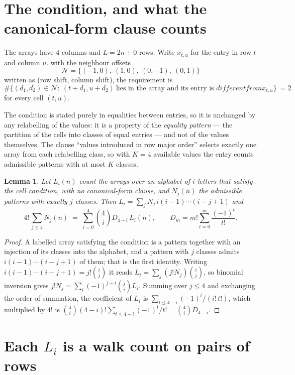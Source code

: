 \documentclass[11pt,a4paper]{article}
\theoremstyle{plain}
\newtheorem{lemma}[theorem]{Lemma}
\theoremstyle{definition}
\begin{document}
\section{The condition, and what the canonical-form clause counts}

The arrays have $4$ columns and $L=2n+0$ rows. Write $x_{t,u}$ for the entry in
row $t$ and column $u$. with the neighbour offsets
\[
\mathcal N=\{(-1,0),\ (1,0),\ (0,-1),\ (0,1)\}
\]
written as (row shift, column shift), the requirement is
\begin{equation}\label{eq:loc}
\#\bigl\{(d_1,d_2)\in\mathcal N:\ (t+d_1,u+d_2)\ \text{lies in the array and its entry is }
different from x_{t,u}\bigr\}\ =2
\end{equation}
for every cell $(t,u)$.

The condition is stated purely in equalities between entries, so it is unchanged by any
relabelling of the values: it is a property of the \emph{equality pattern} --- the partition
of the cells into classes of equal entries --- and not of the values themselves. The clause
``values introduced in row major order'' selects exactly one array from each relabelling
class, so with $K=4$ available values the entry counts admissible patterns with at most $K$
classes.

\begin{lemma}\label{lem:inv}
Let $L_i(n)$ count the arrays over an alphabet of $i$ letters that satisfy the cell
condition, with no canonical-form clause, and $N_j(n)$ the admissible patterns with exactly
$j$ classes. Then $L_i=\sum_j N_j\,i(i-1)\cdots(i-j+1)$ and
\[
4!\,\sum_{j\le 4}N_j(n)\;=\;\sum_{i=0}^{4}\binom{4}{i}D_{4-i}\,L_i(n),
\qquad D_m=m!\sum_{t=0}^{m}\frac{(-1)^t}{t!} .
\]
\end{lemma}

\begin{proof}
A labelled array satisfying the condition is a pattern together with an injection of its
classes into the alphabet, and a pattern with $j$ classes admits $i(i-1)\cdots(i-j+1)$ of
them; that is the first identity. Writing $i(i-1)\cdots(i-j+1)=j!\binom{i}{j}$ it reads
$L_i=\sum_j(j!N_j)\binom{i}{j}$, so binomial inversion gives
$j!N_j=\sum_i(-1)^{j-i}\binom{j}{i}L_i$. Summing over $j\le4$ and exchanging the
order of summation, the coefficient of $L_i$ is
$\sum_{t\le4-i}(-1)^t/(i!\,t!)$, which multiplied by $4!$ is
$\binom{4}{i}(4-i)!\sum_{t\le4-i}(-1)^t/t!=\binom{4}{i}D_{4-i}$.
\end{proof}

\section{Each $L_i$ is a walk count on pairs of rows}
\end{document}
